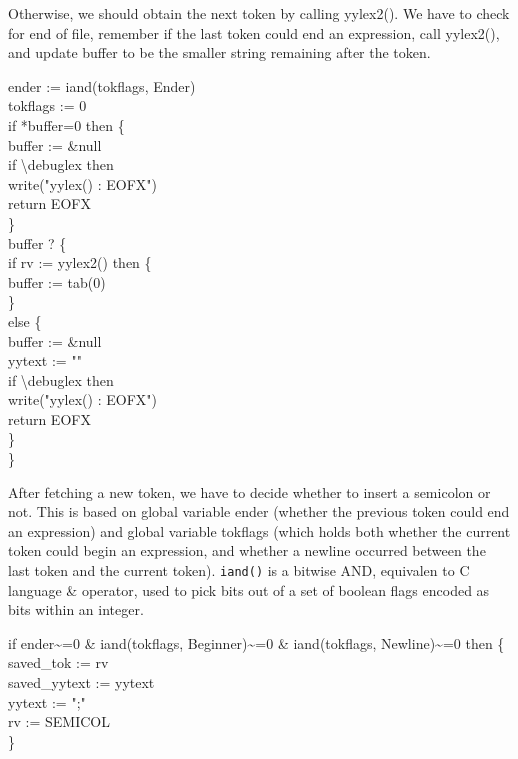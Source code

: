 Otherwise, we should obtain the next token by calling yylex2(). We
have to check for end of file, remember if the last token could end an
expression, call yylex2(), and update buffer to be the smaller string
remaining after the token.

\begin{iconcode}
\>   ender := iand(tokflags, Ender) \\
\>   tokflags := 0 \\
\>   if *buffer=0 then \{ \\
\> \>     buffer := \&null \\
\> \>     if {\textbackslash}debuglex then \\
\> \> \>        write("yylex() : EOFX") \\
\> \>     return EOFX \\
\> \>    \} \\
\>   buffer ? \{ \\
\> \>     if rv := yylex2() then \{ \\
\> \> \>        buffer := tab(0) \\
\> \> \>        \} \\
\> \>     else \{ \\
\> \> \>       buffer := \&null \\
\> \> \>       yytext := "" \\
\> \> \>       if {\textbackslash}debuglex then \\
\> \> \> \>          write("yylex() : EOFX") \\
\> \> \>       return EOFX \\
\> \> \>       \} \\
\> \>    \}
\end{iconcode}

After fetching a new token, we have to decide whether to insert a
semicolon or not. This is based on global variable ender (whether the
previous token could end an expression) and global variable tokflags
(which holds both whether the current token could begin an expression,
and whether a newline occurred between the last token and the current
token).  \texttt{iand()} is a bitwise AND, equivalen to C language \&
operator, used to pick bits out of a set of boolean flags encoded as
bits within an integer.

\begin{iconcode}
\>   if ender\~{}=0 \& iand(tokflags, Beginner)\~{}=0 \& iand(tokflags, Newline)\~{}=0 then \{ \\
\> \>   saved\_tok := rv \\
\> \>   saved\_yytext := yytext \\
\> \>   yytext := ";" \\
\> \>   rv := SEMICOL \\
\> \>   \}
\end{iconcode}

